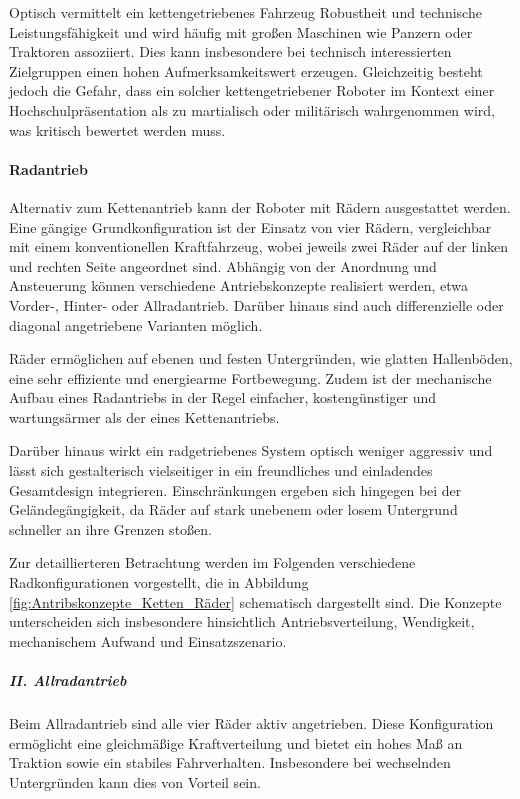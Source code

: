 Optisch vermittelt ein kettengetriebenes Fahrzeug Robustheit und technische Leistungsfähigkeit und wird häufig mit großen Maschinen wie Panzern oder Traktoren assoziiert. Dies kann insbesondere bei technisch interessierten Zielgruppen einen hohen Aufmerksamkeitswert erzeugen. Gleichzeitig besteht jedoch die Gefahr, dass ein solcher kettengetriebener Roboter im Kontext einer Hochschulpräsentation als zu martialisch oder militärisch wahrgenommen wird, was kritisch bewertet werden muss.

\paragraph{Radantrieb}
Alternativ zum Kettenantrieb kann der Roboter mit Rädern ausgestattet werden. Eine gängige Grundkonfiguration ist der Einsatz von vier Rädern, vergleichbar mit einem konventionellen Kraftfahrzeug, wobei jeweils zwei Räder auf der linken und rechten Seite angeordnet sind. Abhängig von der Anordnung und Ansteuerung können verschiedene Antriebskonzepte realisiert werden, etwa Vorder-, Hinter- oder Allradantrieb. Darüber hinaus sind auch differenzielle oder diagonal angetriebene Varianten möglich.

Räder ermöglichen auf ebenen und festen Untergründen, wie glatten Hallenböden, eine sehr effiziente und energiearme Fortbewegung. Zudem ist der mechanische Aufbau eines Radantriebs in der Regel einfacher, kostengünstiger und wartungsärmer als der eines Kettenantriebs. \cite{siegwart2011introduction}

Darüber hinaus wirkt ein radgetriebenes System optisch weniger aggressiv und lässt sich gestalterisch vielseitiger in ein freundliches und einladendes Gesamtdesign integrieren. Einschränkungen ergeben sich hingegen bei der Geländegängigkeit, da Räder auf stark unebenem oder losem Untergrund schneller an ihre Grenzen stoßen.

Zur detaillierteren Betrachtung werden im Folgenden verschiedene Radkonfigurationen vorgestellt, die in Abbildung \ref{fig:Antribskonzepte_Ketten_Räder} schematisch dargestellt sind. Die Konzepte unterscheiden sich insbesondere hinsichtlich Antriebsverteilung, Wendigkeit, mechanischem Aufwand und Einsatzszenario.

\subparagraph{II. Allradantrieb}
Beim Allradantrieb sind alle vier Räder aktiv angetrieben. Diese Konfiguration ermöglicht eine gleichmäßige Kraftverteilung und bietet ein hohes Maß an Traktion sowie ein stabiles Fahrverhalten. Insbesondere bei wechselnden Untergründen kann dies von Vorteil sein. \cite{siegwart2011introduction}\cite{wong2001theory}

